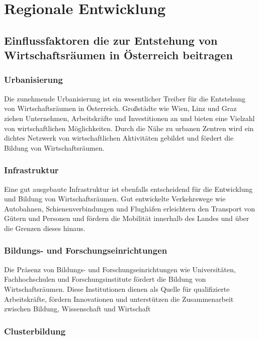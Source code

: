 \section{Regionale Entwicklung}

\subsection{Einflussfaktoren die zur Entstehung von Wirtschaftsräumen in Österreich beitragen}

\subsubsection{Urbanisierung}

Die zunehmende Urbanisierung ist ein wesentlicher Treiber für die Entstehung von Wirtschaftsräumen in Österreich. Großstädte wie Wien, Linz und Graz ziehen Unternehmen, Arbeitskräfte und Investitionen an und bieten eine Vielzahl von wirtschaftlichen Möglichkeiten. Durch die Nähe zu urbanen Zentren wird ein dichtes Netzwerk von wirtschaftlichen Aktivitäten gebildet und fördert die Bildung von Wirtschaftsräumen.

\subsubsection{Infrastruktur}

Eine gut ausgebaute Infrastruktur ist ebenfalls entscheidend für die Entwicklung und Bildung von Wirtschaftsräumen. Gut entwickelte Verkehrswege wie Autobahnen, Schienenverbindungen und Flughäfen erleichtern den Transport von Gütern und Personen und fördern die Mobilität innerhalb des Landes und über die Grenzen dieses hinaus.

\subsubsection{Bildungs- und Forschungseinrichtungen}

Die Präsenz von Bildungs- und Forschungseinrichtungen wie Universitäten, Fachhochschulen und Forschungsinstitute fördert die Bildung von Wirtschaftsräumen. Diese Institutionen dienen als Quelle für qualifizierte Arbeitskräfte, fördern Innovationen und unterstützen die Zusammenarbeit zwischen Bildung, Wissenschaft und Wirtschaft

\subsubsection{Clusterbildung}

